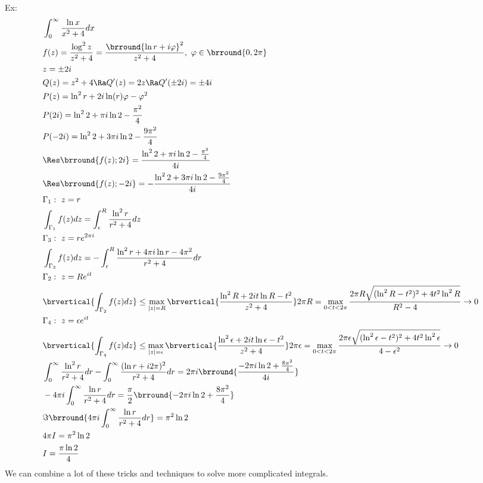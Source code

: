 Ex:
\begin{align*}
    &\int_0^\infty\frac{\ln x}{x^2+4}dx\\
    &f(z)=\frac{\log^2 z}{z^2+4}=\frac{\brround{\ln r+i\varphi}^2}{z^2+4},\ \varphi\in\brround{0,2\pi}\\
    &z=\pm 2i\\
    &Q(z)=z^2+4\Ra Q'(z)=2z\Ra Q'(\pm 2i)=\pm 4i\\
    &P(z)=\ln^2r+2i\ln (r)\varphi-\varphi^2\\
    &P(2i)=\ln^2 2+\pi i\ln 2-\frac{\pi^2}{4}\\
    &P(-2i)=\ln^2 2+3\pi i\ln 2-\frac{9\pi^2}{4}\\
    &\Res\brround{f(z);2i}=\frac{\ln^2 2+\pi i\ln 2-\frac{\pi^2}{4}}{4i}\\
    &\Res\brround{f(z);-2i}=-\frac{\ln^2 2+3\pi i\ln 2-\frac{9\pi^2}{4}}{4i}\\
    &\Gamma_1:\ z=r\\
    &\int_{\Gamma_1}f(z)dz=\int_\epsilon^R\frac{\ln^2r}{r^2+4}dz\\
    &\Gamma_3:\ z=re^{2\pi i}\\
    &\int_{\Gamma_3}f(z)dz=-\int_\epsilon^R\frac{\ln^2r+4\pi i\ln r-4\pi^2}{r^2+4}dr\\
    &\Gamma_2:\ z=Re^{i t}\\
    &\brvertical{\int_{\Gamma_2}f(z)dz}\leq\max_{|z|=R}\brvertical{\frac{\ln^2R+2i t\ln R-t^2}{z^2+4}}2\pi R=\max_{0<t<2\pi}\frac{2\pi R\sqrt{(\ln^2R-t^2)^2+4t^2\ln^2R}}{R^2-4}\to0\\
    &\Gamma_4:\ z=\epsilon e^{it}\\
    &\brvertical{\int_{\Gamma_4}f(z)dz}\leq\max_{|z|=\epsilon}\brvertical{\frac{\ln^2\epsilon+2i t\ln \epsilon-t^2}{z^2+4}}2\pi \epsilon=\max_{0<t<2\pi}\frac{2\pi \epsilon\sqrt{(\ln^2\epsilon-t^2)^2+4t^2\ln^2\epsilon}}{4-\epsilon^2}\to0\\
    &\int_0^\infty\frac{\ln^2 r}{r^2+4}dr-\int_0^\infty\frac{(\ln r+i2\pi)^2}{r^2+4}dr=2\pi i\brround{\frac{-2\pi i\ln 2+\frac{8\pi^2}{4}}{4i}}\\
    &-4\pi i\int_0^\infty\frac{\ln r}{r^2+4}dr=\frac{\pi}{2}\brround{-2\pi i\ln2+\frac{8\pi^2}{4}}\\
    &\Im\brround{4\pi i\int_0^\infty\frac{\ln r}{r^2+4}dr}=\pi^2\ln 2\\
    &4\pi I=\pi^2\ln 2\\
    &I=\frac{\pi\ln2}{4}
\end{align*}
We can combine a lot of these tricks and techniques to solve more complicated integrals.\\
